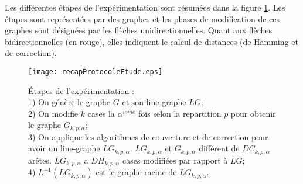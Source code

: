 Les diff\'erentes \'etapes de l'exp\'erimentation sont r\'esum\'ees dans la figure \ref{recapProtocoleEtude}. Les \'etapes sont repr\'esent\'ees par des graphes et les phases de modification de ces graphes sont d\'esign\'ees par les fl\`eches unidirectionnelles. Quant aux fl\`eches bidirectionnelles (en rouge), elles indiquent le calcul de distances (de Hamming et de correction). 
\begin{figure}[htb!] 
\centering
\texttt{[image: recapProtocoleEtude.eps]}
\caption{\'Etapes de l'exp\'erimentation :  \\
1) On g\'en\`ere le graphe $G$ et son line-graphe $LG$;\\ 
2) On modifie $k$ cases la $\alpha^{ieme}$ fois selon la repartition $p$ pour obtenir le graphe $G_{k,p,\alpha}$;\\ 
3) On applique les algorithmes de couverture et de correction pour avoir un line-graphe $LG_{k,p,\alpha}$. $LG_{k,p,\alpha}$ et  $G_{k,p,\alpha}$ diff\`erent de $DC_{k,p,\alpha}$ ar\^etes. $LG_{k,p,\alpha}$ a $DH_{k,p,\alpha}$ cases modifi\'ees par rapport \`a $LG$; 
\\ 4) $L^{-1}(LG_{k,p,\alpha})$ est le graphe racine de $LG_{k,p,\alpha}$. }
\label{recapProtocoleEtude} 
\end{figure}
\newline


